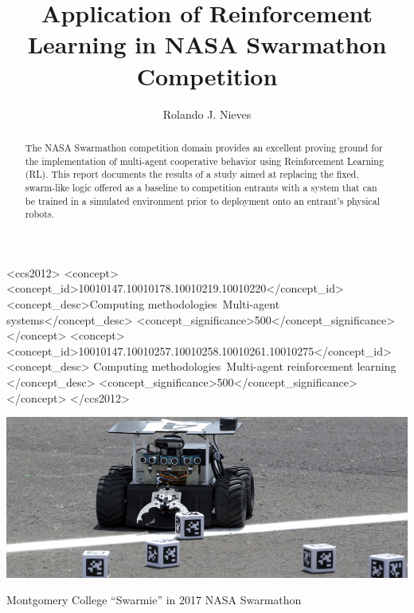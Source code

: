\documentclass[sigconf,authordraft]{acmart}
\begin{document}
\title{Application of Reinforcement Learning in NASA Swarmathon Competition}

\author{Rolando J. Nieves}
\authornotemark[1]

\renewcommand{\shortauthors}{Nieves}

\begin{abstract}
  The NASA Swarmathon competition domain provides an excellent proving ground
  for the implementation of multi-agent cooperative behavior using Reinforcement
  Learning (RL). This report documents the results of a study aimed at replacing
  the fixed, swarm-like logic offered as a baseline to competition entrants with
  a system that can be trained in a simulated environment prior to deployment
  onto an entrant's physical robots.
\end{abstract}

\begin{CCSXML}
  <ccs2012>
    <concept>
      <concept_id>10010147.10010178.10010219.10010220</concept_id>
      <concept_desc>Computing methodologies~Multi-agent systems</concept_desc>
      <concept_significance>500</concept_significance>
    </concept>
    <concept>
      <concept_id>10010147.10010257.10010258.10010261.10010275</concept_id>
      <concept_desc>
        Computing methodologies~Multi-agent reinforcement learning
      </concept_desc>
      <concept_significance>500</concept_significance>
    </concept>
  </ccs2012>
\end{CCSXML}



\begin{teaserfigure}
  \includegraphics[width=\textwidth]{images/swarmathon-teaser.jpg}
  \caption{Montgomery College ``Swarmie'' in 2017 NASA Swarmathon}
  \label{fig:teaser}
\end{teaserfigure}
\end{document}
